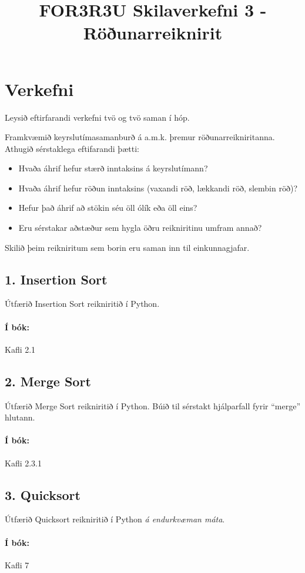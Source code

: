 \documentclass{article}
\title{FOR3R3U Skilaverkefni 3 - Röðunarreiknirit}
\begin{document}
\maketitle
\section{Verkefni}
Leysið eftirfarandi verkefni tvö og tvö saman í hóp.

Framkvæmið keyrslutímasamanburð á a.m.k. þremur röðunarreikniritanna. Athugið sérstaklega eftifarandi þætti:
\begin{itemize}
 \item Hvaða áhrif hefur stærð inntaksins á keyrslutímann?
 \item Hvaða áhrif hefur röðun inntaksins (vaxandi röð, lækkandi röð, slembin röð)?
 \item Hefur það áhrif að stökin séu öll ólík eða öll eins?
 \item Eru sérstakar aðstæður sem hygla öðru reikniritinu umfram annað?
\end{itemize}
Skilið þeim reikniritum sem borin eru saman inn til einkunnagjafar.

\subsection{1. Insertion Sort}
Útfærið Insertion Sort reikniritið í Python.

\paragraph{Í bók:} Kafli 2.1
\subsection{2. Merge Sort}
Útfærið Merge Sort reikniritið í Python. Búið til sérstakt hjálparfall fyrir ``merge'' hlutann.

\paragraph{Í bók:} Kafli 2.3.1

\subsection{3. Quicksort}
Útfærið Quicksort reikniritið í Python \emph{á endurkvæman máta}.

\paragraph{Í bók:} Kafli 7
\end{document}
